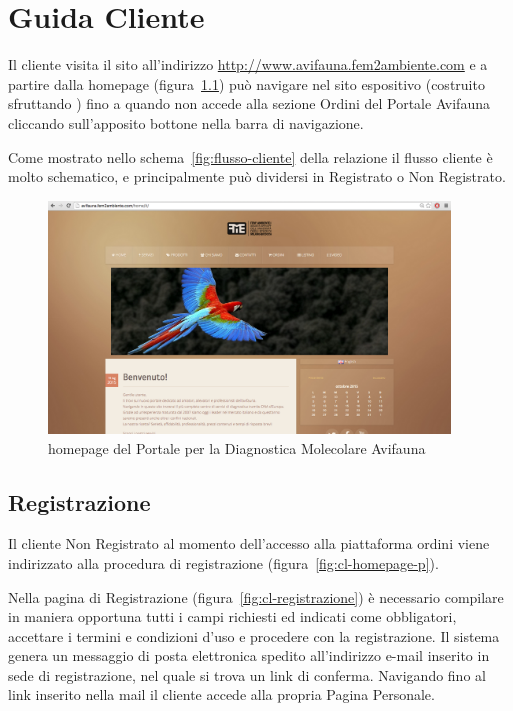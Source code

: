 \chapter{Guida Cliente}
\label{app:cliente}
Il cliente visita il sito all'indirizzo \url{http://www.avifauna.fem2ambiente.com} e a partire dalla homepage (figura~\ref{fig:cl-homepage-wp}) può navigare nel sito espositivo (costruito sfruttando {\wp}) fino a quando non accede alla sezione \textsf{Ordini} del Portale Avifauna cliccando sull'apposito bottone nella barra di navigazione.

Come mostrato nello schema~\ref{fig:flusso-cliente} della relazione il flusso cliente è molto schematico, e principalmente può dividersi in \textsf{Registrato} o \textsf{Non Registrato}.

\begin{figure}
 \includegraphics[width=0.95\textwidth]{images/cl-homepage-wp} 
 \caption{homepage del Portale per la Diagnostica Molecolare Avifauna}
 \label{fig:cl-homepage-wp}
\end{figure}

\section*{Registrazione}
Il cliente \textsf{Non Registrato} al momento dell'accesso alla piattaforma ordini viene indirizzato alla procedura di registrazione (figura~\ref{fig:cl-homepage-p}).

Nella pagina di \textsf{Registrazione} (figura~\ref{fig:cl-registrazione}) è necessario compilare in maniera opportuna tutti i campi richiesti ed indicati come obbligatori, accettare i termini e condizioni d'uso e procedere con la registrazione. Il sistema genera un messaggio di posta elettronica spedito all'indirizzo e-mail inserito in sede di registrazione, nel quale si trova un link di conferma. Navigando fino al link inserito nella mail il cliente accede alla propria \textsf{Pagina Personale}.

